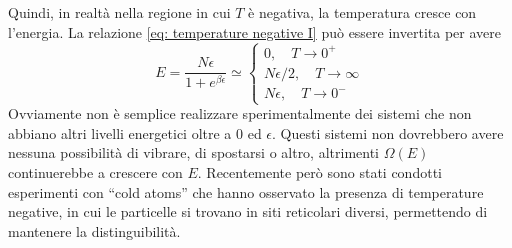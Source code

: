 Quindi, in realtà nella regione in cui $T$ è negativa, la temperatura cresce con l'energia. La relazione \eqref{eq: temperature negative I} può essere invertita per avere
\begin{equation}
    E = \frac{N\epsilon}{1 + e^{\beta\epsilon}} \simeq 
    \begin{cases}
        0,\quad T \to 0^+ \\
        N\epsilon/2,\quad T \to \infty \\
        N\epsilon,\quad T \to 0^-
    \end{cases}
\end{equation}
Ovviamente non è semplice realizzare sperimentalmente dei sistemi che non abbiano altri livelli energetici oltre a $0$ ed $\epsilon$. Questi sistemi non dovrebbero avere nessuna possibilità di vibrare, di spostarsi o altro, altrimenti $\Omega(E)$ continuerebbe a crescere con $E$. Recentemente però sono stati condotti esperimenti con ``cold atoms'' che hanno osservato la presenza di temperature negative, in cui le particelle
si trovano in siti reticolari diversi, permettendo di mantenere la distinguibilità.

